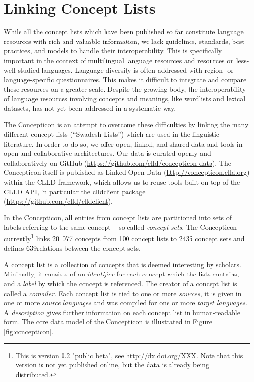 \documentclass[10pt, a4paper]{article}
\newcommand{\conceptnumber}{\textcolor{black}{20~077} }
\newcommand{\listnumber}{\textcolor{black}{100} }
\newcommand{\setnumber}{\textcolor{black}{2435} }
\newcommand{\relationnumber}{\textcolor{black}{639}}
\begin{document}
\section{Linking Concept Lists}
\noindent While all the concept lists which have been published so far constitute language
resources with rich and valuable information, we lack guidelines, standards, best practices, and
models to handle their interoperability. This is specifically important in the context of
multilingual language resources and resources on less-well-studied languages. 
Language diversity is often addressed with region- or
language-specific questionnaires. This makes it difficult to integrate and compare these resources
on a greater scale. Despite the growing body, the interoperability of language resources involving
concepts and meanings, like wordlists and lexical datasets, has not yet been addressed in a
systematic way.  
 
The Concepticon is an attempt to overcome these difficulties by linking the many different concept
lists (``Swadesh Lists'') which are used in the linguistic literature.  In order to do so, we offer
open, linked, and shared data and tools in open and collaborative architectures. Our data is curated
openly and collaboratively on GitHub (\url{https://github.com/clld/concepticon-data}). The
Concepticon itself is published as Linked Open Data (\url{http://concepticon.clld.org}) within the
CLLD framework, which allows us to reuse tools built on top of the CLLD API, in particular the
clldclient package (\url{https://github.com/clld/clldclient}).
 
In the Concepticon, all entries from concept lists are partitioned into sets
of labels referring to the same concept -- so called \emph{concept sets}. 
The Concepticon currently\footnote{This is version 0.2 "public beta", see \url{http://dx.doi.org/XXX}.
Note that this version is not yet published online, but the data is already being distributed.} links
\conceptnumber concepts from \listnumber concept lists to \setnumber concept sets and defines
\relationnumber relations between the concept sets.
 
A concept list is a collection of concepts that is deemed interesting by scholars. Minimally, it
consists of an \emph{identifier} for each concept which the lists contains, and a \emph{label} by
which the concept is referenced. The creator of a concept list is called a \emph{compiler}. Each
concept list is tied to one or more \emph{sources}, it is given in one or more \emph{source
languages} and was compiled for one or more \emph{target languages}. A \emph{description} gives
further information on each concept list in human-readable form. The core
data model of the Concepticon is illustrated in Figure \ref{fig:concepticon}.
 
\end{document}

